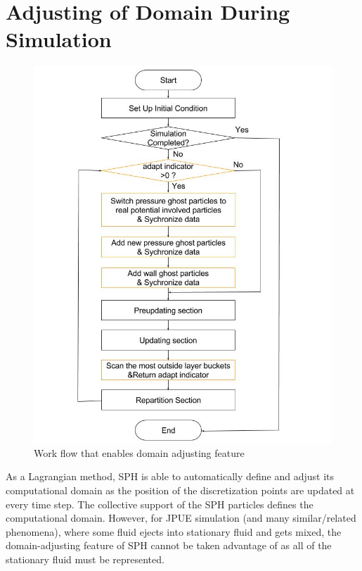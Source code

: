\documentclass[conference,compsoc]{IEEEtran}
\begin{document}
\section{Adjusting of Domain During Simulation}
\begin{figure}[!t]
\centering
\includegraphics[scale=0.36]{Work_flow_adjust}
\caption{Work flow that enables domain adjusting feature}
\label{fig:Work_flow_adjust}
\end{figure}
As a Lagrangian method, SPH is able to automatically define and adjust its computational domain as the position of the discretization points are updated at every time step.  The 
collective support of the SPH particles defines the computational domain. However, for JPUE simulation (and many similar/related phenomena), where some fluid ejects into stationary fluid and gets mixed, the domain-adjusting feature of SPH cannot be taken advantage of as all of the stationary fluid must be represented. %
\end{document}

